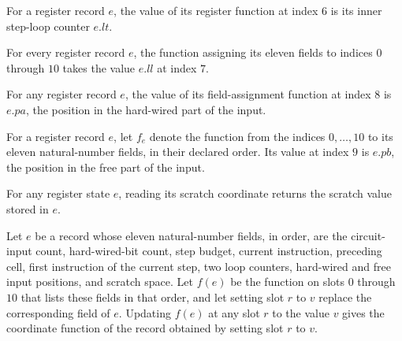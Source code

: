 \begin{theorem}
\label{Complexity.UTab.ER.f_lt}
\leanok
{}
For a register record $e$, the value of its register function at index $6$ is its inner
step-loop counter $e.lt$.
\end{theorem}

\begin{theorem}
\label{Complexity.UTab.ER.f_ll}
\leanok
{}
For every register record $e$, the function assigning its eleven fields to indices $0$
through $10$ takes the value $e.ll$ at index $7$.
\end{theorem}

\begin{theorem}
\label{Complexity.UTab.ER.f_pa}
\leanok
{}
For any register record $e$, the value of its field-assignment function at index $8$ is
$e.pa$, the position in the hard-wired part of the input.
\end{theorem}

\begin{theorem}
\label{Complexity.UTab.ER.f_pb}
\leanok
{}
For a register record $e$, let $f_e$ denote the function from the indices $0,\ldots,10$ to its eleven natural-number fields, in their declared order. Its value at index
$9$ is $e.pb$, the position in the free part of the input.
\end{theorem}

\begin{theorem}
\label{Complexity.UTab.ER.f_tmp}
\leanok
{}
For any register state $e$, reading its scratch coordinate returns the scratch value
stored in $e$.
\end{theorem}

\begin{theorem}
\label{Complexity.UTab.ER.update_f}
\leanok
{}
Let $e$ be a record whose eleven natural-number fields, in order, are the circuit-input
count, hard-wired-bit count, step budget, current instruction, preceding cell, first
instruction of the current step, two loop counters, hard-wired and free input positions,
and scratch space. Let $f(e)$ be the function on slots $0$ through $10$ that lists these
fields in that order, and let setting slot $r$ to $v$ replace the corresponding field of
$e$. Updating $f(e)$ at any slot $r$ to the value $v$ gives the coordinate function of
the record obtained by setting slot $r$ to $v$.
\end{theorem}

